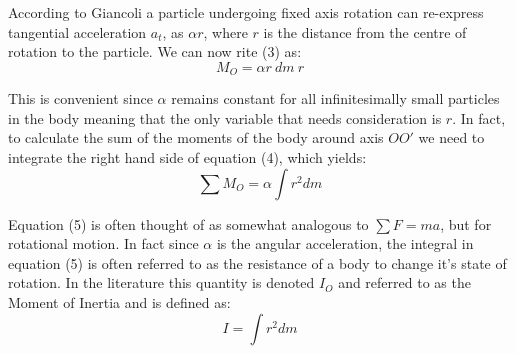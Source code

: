 \documentclass[a4paper]{article}
\begin{document}
According to Giancoli a particle undergoing fixed axis rotation can re-express tangential acceleration $a_t$, as $\alpha r$, where $r$ is the distance from the centre of rotation to the particle. We can now rite (3) as:
\begin{equation}
M_O = \alpha r \ dm \ r
\end{equation}

This is convenient since $\alpha$ remains constant for all infinitesimally small particles in the body meaning that the only variable that needs consideration is $r$. In fact, to calculate the sum of the moments of the body around axis $OO'$ we need to integrate the right hand side of equation (4), which yields:
\begin{equation}
\sum M_O = \alpha \int r^2 dm
\end{equation}

Equation (5) is often thought of as somewhat analogous to $\sum F = ma$, but for rotational motion. In fact since $\alpha$ is the angular acceleration, the integral in equation (5) is often referred to as the resistance of a body to change it's state of rotation. In the literature this quantity is denoted $I_O$ and referred to as the Moment of Inertia and is defined as:
\begin{equation}
I = \int r^2 dm
\end{equation}

\begin{figure}[h]
	\centering
\end{figure}

\begin{figure}[h]
	\centering
\end{figure}
\end{document}
